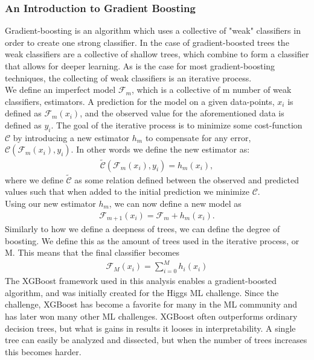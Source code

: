 \subsubsection*{An Introduction to Gradient Boosting}
Gradient-boosting is an algorithm which uses a collective of "weak" 
classifiers in order to create one strong classifier. In the case of gradient-boosted 
trees the weak classifiers are a collective of shallow trees, which combine to form a classifier 
that allows for deeper learning. As is the case for most gradient-boosting 
techniques, the collecting of weak classifiers is an iterative process.
\\
We define an imperfect model $\mathcal{F}_m$, which is a collective of m number of weak 
classifiers, estimators. A prediction for the model on a given data-points, $x_i$ is 
defined as $\mathcal{F}_m(x_i)$, and the observed value for the aforementioned data is 
defined as $y_i$. The goal of the iterative process is to minimize some cost-function 
$\mathcal{C}$ by introducing a new estimator $h_m$ to compensate for any error, 
$\mathcal{C}(\mathcal{F}_m(x_i), y_i)$. In other words we define the new estimator as:
\begin{align}
    \tilde{\mathcal{C}}(\mathcal{F}_m(x_i), y_i) = h_m(x_i),
\end{align}
where we define $\tilde{\mathcal{C}}$ as some relation defined between the observed and 
predicted values such that when added to the initial prediction we minimize $\mathcal{C}$.
\\
Using our new estimator $h_m$, we can now define a new model as
\begin{align}
    \mathcal{F}_{m+1}(x_i) = \mathcal{F}_m + h_m (x_i).
\end{align}
Similarly to how we define a deepness of trees, we can define the degree of boosting. We define 
this as the amount of trees used in the iterative process, or M. This means that the final classifier 
becomes
\begin{align}
    \mathcal{F}_M (x_i) = \sum_{i=0}^M h_i(x_i)
\end{align} 
The XGBoost \cite{XGB} framework used in this analysis enables a gradient-boosted algorithm, 
and was initially created for the Higgs ML challenge. Since the challenge, XGBoost has become 
a favorite for many in the ML community and has later won many other ML challenges. XGBoost 
often outperforms ordinary decision trees, but what is gains in results it looses in 
interpretability. A single tree can easily be analyzed and dissected, but when the number 
of trees increases this becomes harder. 
